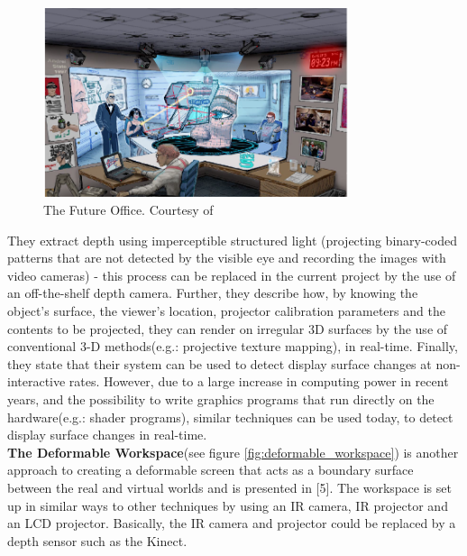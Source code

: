 \documentclass[]{article}
\begin{document}
\begin{figure}[hbtp]
    \centering
    \includegraphics[width=0.8\textwidth]{figures/FutureOffice.PNG}
    \caption{The Future Office. Courtesy of \cite{raskar98}}
    \label{fig:future_office}
\end{figure}

They extract depth using imperceptible structured light (projecting binary-coded patterns that are not detected by the visible eye and recording the images with video cameras) - this process can be replaced in the current project by the use of an off-the-shelf depth camera. Further, they describe how, by knowing the object's surface, the viewer's location, projector calibration parameters and the contents to be projected, they can render on irregular 3D surfaces by the use of conventional 3-D methods(e.g.: projective texture mapping), in real-time. Finally, they state that their system can be used to detect display surface changes at non-interactive rates. However, due to a large increase in computing power in recent years, and the possibility to write graphics programs that run directly on the hardware(e.g.: shader programs), similar techniques can be used today, to detect display surface changes in real-time.\\

\textbf{The Deformable Workspace}(see figure \ref{fig:deformable_workspace}) is another approach to creating a deformable screen that acts as a boundary surface between the real and virtual worlds and is presented in [5]. The workspace is set up in similar ways to other techniques by using an IR camera, IR projector and an LCD projector. Basically, the IR camera and projector could be replaced by a depth sensor such as the Kinect. 
\end{document}
